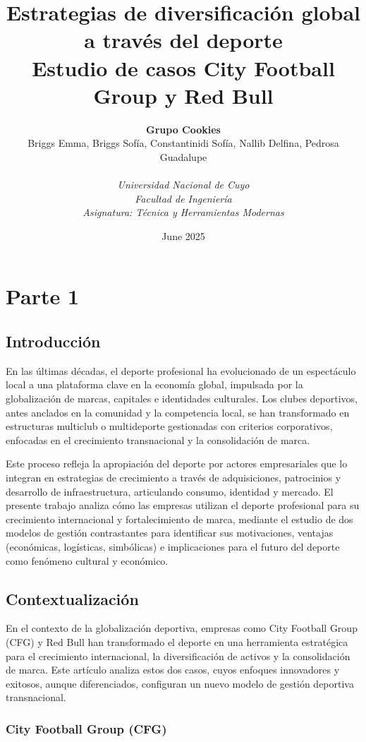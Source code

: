 \documentclass[12pt,a4paper]{article}
\title{\textbf{Estrategias de diversificación global a través del deporte}\\[0.5em]
\large Estudio de casos City Football Group y Red Bull}
\author{
\textbf{Grupo Cookies}\\[0.5em]
    Briggs Emma, Briggs Sofía, Constantinidi Sofía, Nallib Delfina, Pedrosa Guadalupe\\[3em]
\\
\textit{Universidad Nacional de Cuyo} \\
\textit{Facultad de Ingeniería} \\
\textit{Asignatura: Técnica y Herramientas Modernas}
}
\date{June 2025}
\begin{document}
\maketitle
\thispagestyle{empty}
\newpage

\section{Parte 1}

\subsection{Introducción}

En las últimas décadas, el deporte profesional ha evolucionado de un espectáculo local a una plataforma clave en la economía global, impulsada por la globalización de marcas, capitales e identidades culturales. Los clubes deportivos, antes anclados en la comunidad y la competencia local, se han transformado en estructuras multiclub o multideporte gestionadas con criterios corporativos, enfocadas en el crecimiento transnacional y la consolidación de marca.

Este proceso refleja la apropiación del deporte por actores empresariales que lo integran en estrategias de crecimiento a través de adquisiciones, patrocinios y desarrollo de infraestructura, articulando consumo, identidad y mercado. El presente trabajo analiza cómo las empresas utilizan el deporte profesional para su crecimiento internacional y fortalecimiento de marca, mediante el estudio de dos modelos de gestión contrastantes para identificar sus motivaciones, ventajas (económicas, logísticas, simbólicas) e implicaciones para el futuro del deporte como fenómeno cultural y económico.

\subsection{Contextualización}

En el contexto de la globalización deportiva, empresas como City Football Group (CFG) y Red Bull han transformado el deporte en una herramienta estratégica para el crecimiento internacional, la diversificación de activos y la consolidación de marca. Este artículo analiza estos dos casos, cuyos enfoques innovadores y exitosos, aunque diferenciados, configuran un nuevo modelo de gestión deportiva transnacional.

\subsubsection{City Football Group (CFG)}
\end{document}
